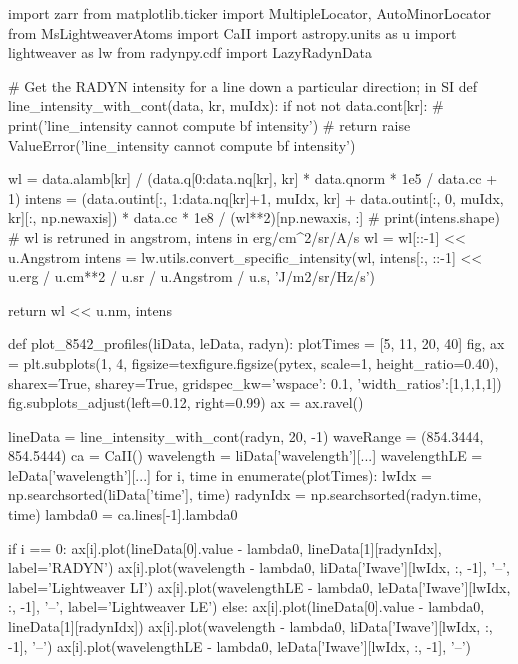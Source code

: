 \begin{pycode}[TimeDepRT]
import zarr
from matplotlib.ticker import MultipleLocator, AutoMinorLocator
from MsLightweaverAtoms import CaII
import astropy.units as u
import lightweaver as lw
from radynpy.cdf import LazyRadynData

# Get the RADYN intensity for a line down a particular direction; in SI
def line_intensity_with_cont(data, kr, muIdx):
    if not not data.cont[kr]:
        # print('line_intensity cannot compute bf intensity')
        # return
        raise ValueError('line_intensity cannot compute bf intensity')

    wl = data.alamb[kr] / (data.q[0:data.nq[kr], kr] *  data.qnorm * 1e5 / data.cc + 1)
    intens = (data.outint[:, 1:data.nq[kr]+1, muIdx, kr] + data.outint[:, 0, muIdx, kr][:, np.newaxis]) *  data.cc * 1e8 / (wl**2)[np.newaxis, :]
    # print(intens.shape)
    # wl is retruned in angstrom, intens in erg/cm^2/sr/A/s
    wl = wl[::-1] << u.Angstrom
    intens = lw.utils.convert_specific_intensity(wl, intens[:, ::-1] << u.erg / u.cm**2 / u.sr / u.Angstrom / u.s, 'J/m2/sr/Hz/s')

    return wl << u.nm, intens

def plot_8542_profiles(liData, leData, radyn):
    plotTimes = [5, 11, 20, 40]
    fig, ax = plt.subplots(1, 4, figsize=texfigure.figsize(pytex, scale=1, height_ratio=0.40),
                           sharex=True, sharey=True,
                           gridspec_kw={'wspace': 0.1, 'width_ratios':[1,1,1,1]})
    fig.subplots_adjust(left=0.12, right=0.99)
    ax = ax.ravel()

    lineData = line_intensity_with_cont(radyn, 20, -1)
    waveRange = (854.3444, 854.5444)
    ca = CaII()
    wavelength = liData['wavelength'][...]
    wavelengthLE = leData['wavelength'][...]
    for i, time in enumerate(plotTimes):
        lwIdx = np.searchsorted(liData['time'], time)
        radynIdx = np.searchsorted(radyn.time, time)
        lambda0 = ca.lines[-1].lambda0

        if i == 0:
            ax[i].plot(lineData[0].value - lambda0, lineData[1][radynIdx], label='RADYN')
            ax[i].plot(wavelength - lambda0, liData['Iwave'][lwIdx, :, -1], '--', label='Lightweaver LI')
            ax[i].plot(wavelengthLE - lambda0, leData['Iwave'][lwIdx, :, -1], '--', label='Lightweaver LE')
        else:
            ax[i].plot(lineData[0].value - lambda0, lineData[1][radynIdx])
            ax[i].plot(wavelength - lambda0, liData['Iwave'][lwIdx, :, -1], '--')
            ax[i].plot(wavelengthLE - lambda0, leData['Iwave'][lwIdx, :, -1], '--')


\end{pycode}
